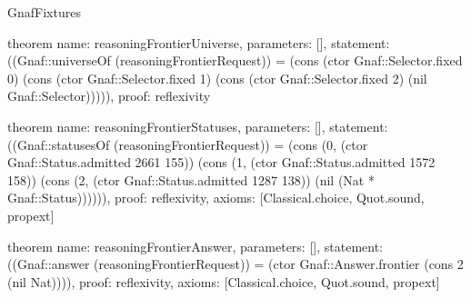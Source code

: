 \begin{lexlean}{GnafFixtures}
\begin{semanticmodule}
theorem{
  name: reasoningFrontierUniverse,
  parameters: [],
  statement: ((Gnaf::universeOf (reasoningFrontierRequest)) = (cons (ctor Gnaf::Selector.fixed 0) (cons (ctor Gnaf::Selector.fixed 1) (cons (ctor Gnaf::Selector.fixed 2) (nil Gnaf::Selector))))),
  proof: reflexivity{}
}

theorem{
  name: reasoningFrontierStatuses,
  parameters: [],
  statement: ((Gnaf::statusesOf (reasoningFrontierRequest)) = (cons (0, (ctor Gnaf::Status.admitted 2661 155)) (cons (1, (ctor Gnaf::Status.admitted 1572 158)) (cons (2, (ctor Gnaf::Status.admitted 1287 138)) (nil (Nat * Gnaf::Status)))))),
  proof: reflexivity{},
  axioms: [Classical.choice, Quot.sound, propext]
}

theorem{
  name: reasoningFrontierAnswer,
  parameters: [],
  statement: ((Gnaf::answer (reasoningFrontierRequest)) = (ctor Gnaf::Answer.frontier (cons 2 (nil Nat)))),
  proof: reflexivity{},
  axioms: [Classical.choice, Quot.sound, propext]
}


\end{semanticmodule}
\end{lexlean}
